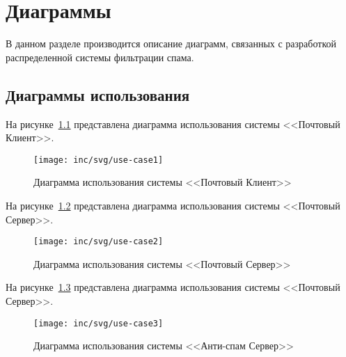 \chapter{Диаграммы}
\label{cha:design}

В данном разделе производится описание диаграмм, связанных с разработкой распределенной системы фильтрации спама.

\section{Диаграммы использования}

На рисунке~\ref{fig:usecase1} представлена диаграмма использования системы <<Почтовый Клиент>>.

\begin{figure}
  \centering
  [width=\textwidth]
  \texttt{[image: inc/svg/use-case1]}
  \caption{Диаграмма использования системы <<Почтовый Клиент>>}
  \label{fig:usecase1}
\end{figure}

На рисунке~\ref{fig:usecase2} представлена диаграмма использования системы <<Почтовый Сервер>>.

\begin{figure}
  \centering
  [width=\textwidth]
  \texttt{[image: inc/svg/use-case2]}
  \caption{Диаграмма использования системы <<Почтовый Сервер>>}
  \label{fig:usecase2}
\end{figure}

На рисунке~\ref{fig:usecase3} представлена диаграмма использования системы <<Почтовый Сервер>>.

\begin{figure}
  \centering
  [width=\textwidth]
  \texttt{[image: inc/svg/use-case3]}
  \caption{Диаграмма использования системы <<Анти-спам Сервер>>}
  \label{fig:usecase3}
\end{figure}




